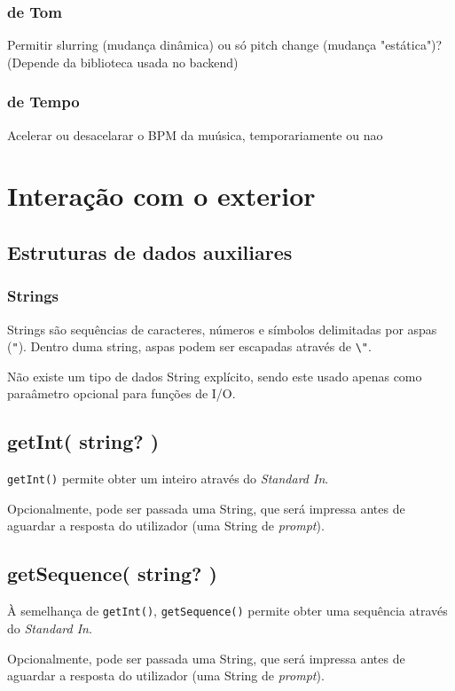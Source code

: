 \documentclass{article}
\begin{document}
\subsubsection{de Tom}
Permitir slurring (mudança dinâmica) ou só pitch change (mudança "estática")? (Depende da biblioteca usada no backend)
\subsubsection{de Tempo}
Acelerar ou desacelarar o BPM da muúsica, temporariamente ou nao

\section{Interação com o exterior} \label{exterior}
\subsection{Estruturas de dados auxiliares}
\subsubsection{Strings}
Strings são sequências de caracteres, números e símbolos delimitadas por aspas (\texttt{"}). Dentro duma string, aspas podem ser escapadas através de \texttt{\textbackslash"}.

Não existe um tipo de dados String explícito, sendo este usado apenas como paraâmetro opcional para funções de I/O.
\subsection{getInt( string? )}
\texttt{getInt()} permite obter um inteiro através do \textit{Standard In}. 

Opcionalmente, pode ser passada uma String, que será impressa antes de aguardar a resposta do utilizador (uma String de \textit{prompt}).

\subsection{getSequence( string? )}
À semelhança de \texttt{getInt()}, \texttt{getSequence()} permite obter uma sequência através do \textit{Standard In}.

Opcionalmente, pode ser passada uma String, que será impressa antes de aguardar a resposta do utilizador (uma String de \textit{prompt}).

\end{document}
